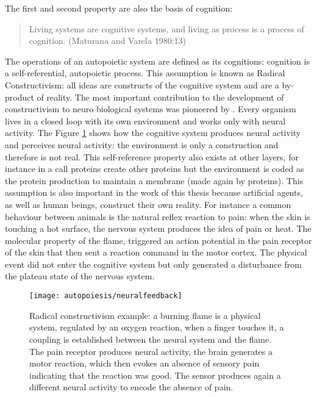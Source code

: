 The first and second property are also the basis of cognition:
\begin{quote}
Living systems are cognitive systems, and living as process is a process of cognition.
(Maturana and Varela 1980:13)
\end{quote}
The operations of an autopoietic system are defined as its cognitions: cognition is
a self-referential, autopoietic process.
This assumption is known as Radical Constructivism:
all ideas are constructs of the cognitive system and are a by-product of reality.
The most important contribution to the development of constructivism to neuro biological
 systems was pioneered by \citet{VanFoerster2003:Cybernetics}.
Every organism lives in a closed loop with its own environment and works only with neural activity.
The Figure \ref{Fig:Autopoiesis:Radical} shows how the cognitive system produces neural activity and
perceives neural activity: the environment is only a construction and therefore is not real.
This self-reference property also exists at other layers, for instance in a call 
proteins create other proteins but the environment is coded as the protein production 
to maintain a membrane (made again by proteins).
This assumption is also important in the work of this thesis because artificial
agents, as well as human beings, construct their own reality. For instance a common behaviour
between animals is the natural reflex reaction to pain: when the skin is touching a
hot surface, the nervous system produces the idea of pain or heat.
The molecular property of the flame, triggered an action potential in the pain
receptor of the skin that then sent a reaction command in the motor cortex.
The physical event did not enter the cognitive system but only generated
a disturbance from the plateau state of the nervous system.

\begin{figure}[htbp]
\begin{center}
\texttt{[image: autopoiesis/neuralfeedback]}
\end{center}
\small{
\caption[Radical constructivism example]{Radical constructivism example:
a burning flame is a physical system,
regulated by an oxygen reaction, when a finger touches it, a coupling is established
between the neural system and the flame.
The pain receptor produces neural activity, the brain generates a motor reaction, which then
 evokes an absence of sensory pain indicating that the reaction was good. 
The sensor produces again a different neural activity to encode the absence of pain.
\label{Fig:Autopoiesis:Radical}}}
\end{figure}

